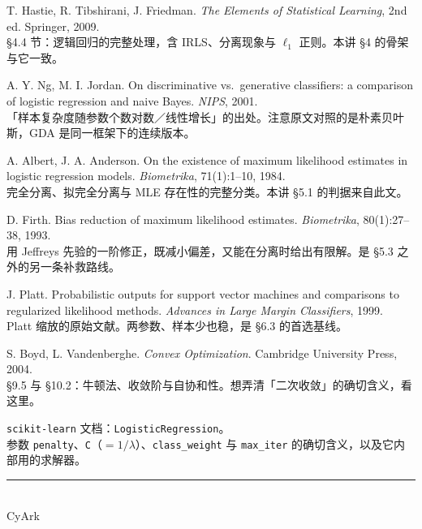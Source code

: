 \documentclass[11pt,a4paper,fontset=windows,zihao=-4]{ctexart}
\begin{document}
\begin{enumerate}[label={[\arabic*]},leftmargin=2.6em,itemsep=0.7em]
  \item T. Hastie, R. Tibshirani, J. Friedman. \emph{The Elements of Statistical Learning}, 2nd ed. Springer, 2009.\\[1pt]
  {\footnotesize\color{steel}\S4.4 节：逻辑回归的完整处理，含 IRLS、分离现象与 $\ell_1$ 正则。本讲 \S4 的骨架与它一致。}

  \item A. Y. Ng, M. I. Jordan. On discriminative vs.\ generative classifiers: a comparison of logistic regression and naive Bayes. \emph{NIPS}, 2001.\\[1pt]
  {\footnotesize\color{steel}「样本复杂度随参数个数对数／线性增长」的出处。注意原文对照的是朴素贝叶斯，GDA 是同一框架下的连续版本。}

  \item A. Albert, J. A. Anderson. On the existence of maximum likelihood estimates in logistic regression models. \emph{Biometrika}, 71(1):1--10, 1984.\\[1pt]
  {\footnotesize\color{steel}完全分离、拟完全分离与 MLE 存在性的完整分类。本讲 \S5.1 的判据来自此文。}

  \item D. Firth. Bias reduction of maximum likelihood estimates. \emph{Biometrika}, 80(1):27--38, 1993.\\[1pt]
  {\footnotesize\color{steel}用 Jeffreys 先验的一阶修正，既减小偏差，又能在分离时给出有限解。是 \S5.3 之外的另一条补救路线。}

  \item J. Platt. Probabilistic outputs for support vector machines and comparisons to regularized likelihood methods. \emph{Advances in Large Margin Classifiers}, 1999.\\[1pt]
  {\footnotesize\color{steel}Platt 缩放的原始文献。两参数、样本少也稳，是 \S6.3 的首选基线。}

  \item S. Boyd, L. Vandenberghe. \emph{Convex Optimization}. Cambridge University Press, 2004.\\[1pt]
  {\footnotesize\color{steel}\S9.5 与 \S10.2：牛顿法、收敛阶与自协和性。想弄清「二次收敛」的确切含义，看这里。}

  \item \texttt{scikit-learn} 文档：\texttt{LogisticRegression}。\\[1pt]
  {\footnotesize\color{steel}参数 \texttt{penalty}、\texttt{C}（$=1/\lambda$）、\texttt{class\_weight} 与 \texttt{max\_iter} 的确切含义，以及它内部用的求解器。}
\end{enumerate}

\vspace{1.0em}
\begin{flushright}
{\color{navy!25}\rule{3.2cm}{0.5pt}}\\[5pt]
{\kaishu\footnotesize\color{steel}CyArk}
\end{flushright}
\end{document}

